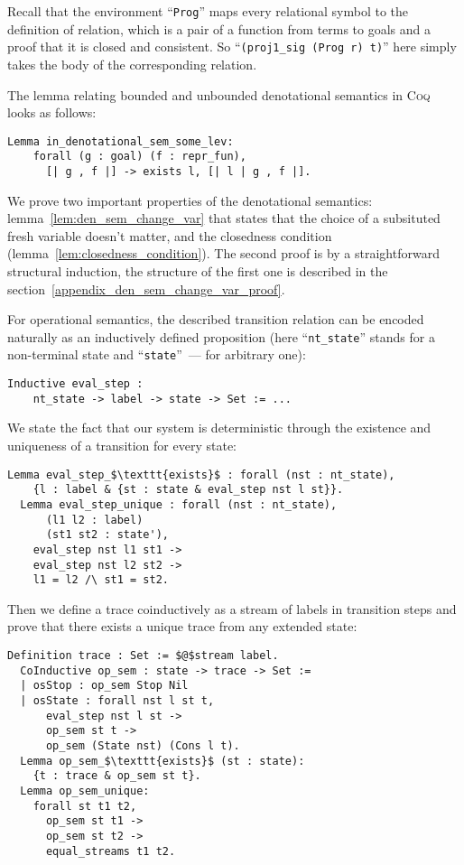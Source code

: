Recall that the environment ``\lstinline[language=Coq]|Prog|'' maps every relational symbol to the definition of relation,
which is a pair of a function from terms to goals and a proof that it is closed and consistent.
So ``\lstinline[language=Coq]|(proj1_sig (Prog r) t)|'' here simply takes the body of the corresponding relation.

The lemma relating bounded and unbounded denotational semantics in \textsc{Coq} looks as follows:

\begin{lstlisting}[language=Coq] 
  Lemma in_denotational_sem_some_lev:
    forall (g : goal) (f : repr_fun),
      [| g , f |] -> exists l, [| l | g , f |].
\end{lstlisting}

We prove two important properties of the denotational semantics: lemma~\ref{lem:den_sem_change_var} that states that the choice of a subsituted fresh variable doesn't matter, and the closedness condition (lemma~\ref{lem:closedness_condition}). The second proof is by a straightforward structural induction, the structure of the first one is described in the section~\ref{appendix_den_sem_change_var_proof}.

For operational semantics, the described transition relation can be encoded naturally as an inductively defined proposition (here ``\lstinline|nt_state|''
stands for a non-terminal state and ``\lstinline|state|''~--- for arbitrary one):

\begin{lstlisting}[language=Coq]
  Inductive eval_step :
    nt_state -> label -> state -> Set := ...
\end{lstlisting}

We state the fact that our system is deterministic through the existence and uniqueness of a transition for every state:

\begin{lstlisting}[language=Coq]
  Lemma eval_step_$\texttt{exists}$ : forall (nst : nt_state),
    {l : label & {st : state & eval_step nst l st}}.
  Lemma eval_step_unique : forall (nst : nt_state),
      (l1 l2 : label)
      (st1 st2 : state'),
    eval_step nst l1 st1 ->
    eval_step nst l2 st2 ->
    l1 = l2 /\ st1 = st2.
\end{lstlisting}

Then we define a trace coinductively as a stream of labels in transition steps and prove that there exists a unique trace from any extended state:

\begin{lstlisting}[language=Coq]
  Definition trace : Set := $@$stream label.
  CoInductive op_sem : state -> trace -> Set :=
  | osStop : op_sem Stop Nil
  | osState : forall nst l st t,
      eval_step nst l st ->
      op_sem st t ->
      op_sem (State nst) (Cons l t).
  Lemma op_sem_$\texttt{exists}$ (st : state):
    {t : trace & op_sem st t}.
  Lemma op_sem_unique:
    forall st t1 t2,
      op_sem st t1 ->
      op_sem st t2 ->
      equal_streams t1 t2.
\end{lstlisting}

